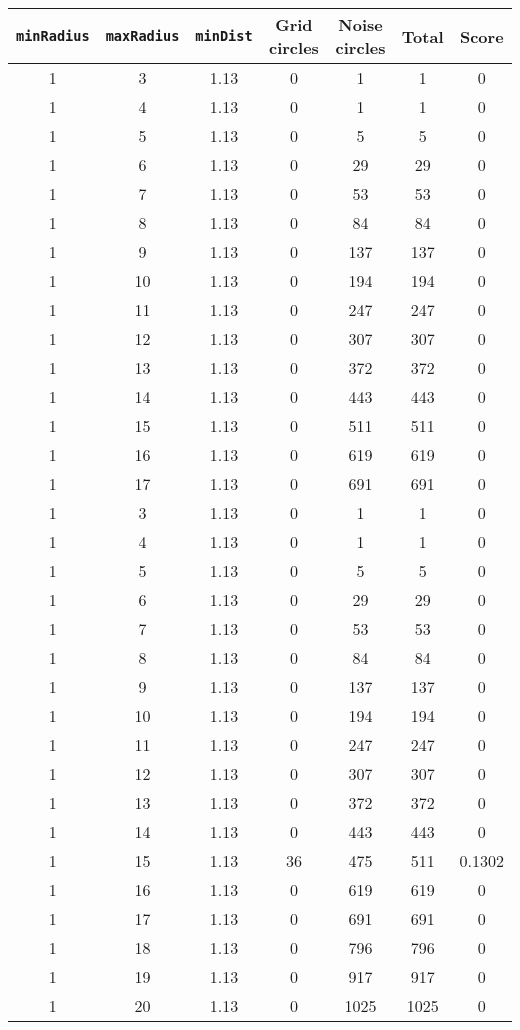 \documentclass[letterpaper, 12pt]{article}
\begin{document}
\begin{longtable}{|c|c|c|c|c|c|c|}
\hline
\textbf{\texttt{minRadius}} & \textbf{\texttt{maxRadius}} & \textbf{\texttt{minDist}} & \textbf{Grid circles} & \textbf{Noise circles} & \textbf{Total} & \textbf{Score} \\
\hline
1 & 3 & 1.13 & 0 & 1 & 1 & 0 \\
\hline
1 & 4 & 1.13 & 0 & 1 & 1 & 0 \\
\hline
1 & 5 & 1.13 & 0 & 5 & 5 & 0 \\
\hline
1 & 6 & 1.13 & 0 & 29 & 29 & 0 \\
\hline
1 & 7 & 1.13 & 0 & 53 & 53 & 0 \\
\hline
1 & 8 & 1.13 & 0 & 84 & 84 & 0 \\
\hline
1 & 9 & 1.13 & 0 & 137 & 137 & 0 \\
\hline
1 & 10 & 1.13 & 0 & 194 & 194 & 0 \\
\hline
1 & 11 & 1.13 & 0 & 247 & 247 & 0 \\
\hline
1 & 12 & 1.13 & 0 & 307 & 307 & 0 \\
\hline
1 & 13 & 1.13 & 0 & 372 & 372 & 0 \\
\hline
1 & 14 & 1.13 & 0 & 443 & 443 & 0 \\
\hline
1 & 15 & 1.13 & 0 & 511 & 511 & 0 \\
\hline
1 & 16 & 1.13 & 0 & 619 & 619 & 0 \\
\hline
1 & 17 & 1.13 & 0 & 691 & 691 & 0 \\
\hline
1 & 3 & 1.13 & 0 & 1 & 1 & 0 \\
\hline
1 & 4 & 1.13 & 0 & 1 & 1 & 0 \\
\hline
1 & 5 & 1.13 & 0 & 5 & 5 & 0 \\
\hline
1 & 6 & 1.13 & 0 & 29 & 29 & 0 \\
\hline
1 & 7 & 1.13 & 0 & 53 & 53 & 0 \\
\hline
1 & 8 & 1.13 & 0 & 84 & 84 & 0 \\
\hline
1 & 9 & 1.13 & 0 & 137 & 137 & 0 \\
\hline
1 & 10 & 1.13 & 0 & 194 & 194 & 0 \\
\hline
1 & 11 & 1.13 & 0 & 247 & 247 & 0 \\
\hline
1 & 12 & 1.13 & 0 & 307 & 307 & 0 \\
\hline
1 & 13 & 1.13 & 0 & 372 & 372 & 0 \\
\hline
1 & 14 & 1.13 & 0 & 443 & 443 & 0 \\
\hline
1 & 15 & 1.13 & 36 & 475 & 511 & 0.1302 \\
\hline
1 & 16 & 1.13 & 0 & 619 & 619 & 0 \\
\hline
1 & 17 & 1.13 & 0 & 691 & 691 & 0 \\
\hline
1 & 18 & 1.13 & 0 & 796 & 796 & 0 \\
\hline
1 & 19 & 1.13 & 0 & 917 & 917 & 0 \\
\hline
1 & 20 & 1.13 & 0 & 1025 & 1025 & 0 \\
\hline
\end{longtable}
\end{document}

